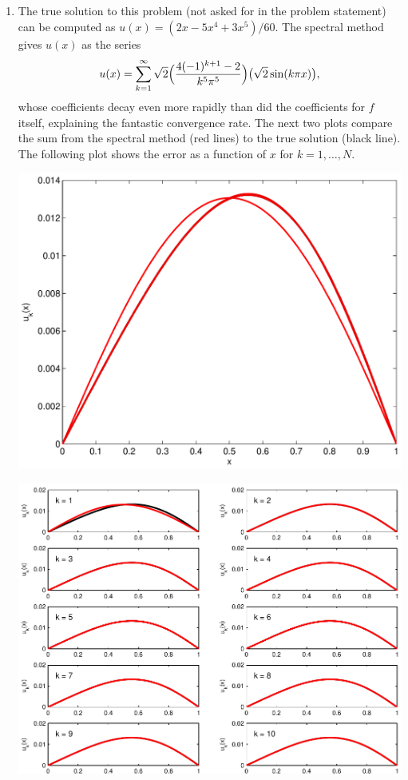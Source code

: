 \begin{solution}
\begin{enumerate}
    \vspace*{1em} 
    \item The true solution to this problem (not asked for in the problem statement)
          can be computed as $u(x) = (2x-5x^4+3x^5)/60$.
          The spectral method gives $u(x)$ as the series
               \[ u(x) = \sum_{k=1}^\infty \sqrt{2}\Big({4(-1)^{k+1}-2 \over k^5 \pi^5}\Big)
                          \big(\sqrt{2} \sin(k \pi x)\big), \]
          whose coefficients decay even more rapidly than did the coefficients
          for $f$ itself, explaining the fantastic convergence rate.
          The next two plots compare the sum from the spectral method (red lines)
          to the true solution (black line).  The following plot shows the error as
          a function of $x$ for $k=1,\ldots, N$.

          \begin{center}\includegraphics[scale=0.45]{sineseries2d}\end{center}
          \begin{center}\includegraphics[scale=0.7]{sineseries2e}\end{center}


\end{enumerate}
\end{solution}
